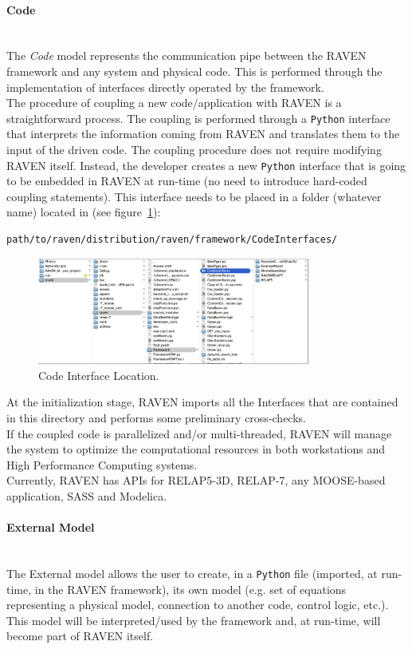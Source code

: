 \paragraph{Code} ~\\ 
The \textit{Code} model represents the communication pipe between the RAVEN framework and any system and physical code. This is performed through the implementation of interfaces directly operated by the framework. 
\\The procedure of coupling a new code/application with RAVEN is a straightforward process. The coupling is performed through a \texttt{Python}  interface that interprets the information coming from RAVEN and translates them to the input of the driven code. The coupling procedure does not require modifying RAVEN itself. Instead, the developer creates a new \texttt{Python} interface that is going to be embedded in RAVEN at run-time (no need to introduce hard-coded coupling statements).  This interface needs to be placed in a folder (whatever name) located in (see figure~\ref{fig:CodeInterfaceLocation}):
\begin{lstlisting}[language=bash]
 path/to/raven/distribution/raven/framework/CodeInterfaces/
\end{lstlisting}

\begin{figure}
  \centering
  \includegraphics[width=0.8\textwidth]  {pics/CodeInterfaceLocation.png}
  \caption{Code Interface Location.}
  \label{fig:CodeInterfaceLocation}
\end{figure}
At the initialization stage, RAVEN imports all the Interfaces that are contained in this directory and performs some preliminary cross-checks. 
\\ If the coupled code is parallelized and/or multi-threaded, RAVEN will manage the system to optimize the computational resources in both workstations and High Performance Computing systems.
\\Currently, RAVEN has APIs for RELAP5-3D, RELAP-7, any MOOSE-based application, SASS and Modelica.
\paragraph{External Model} ~\\
The External model allows the user to create, in a \texttt{Python} file (imported, at run-time, in the RAVEN framework), its own model (e.g. set of equations representing a physical model, connection to another code, control logic, etc.). This model will be interpreted/used by the framework and, at run-time, will become part of RAVEN itself.

